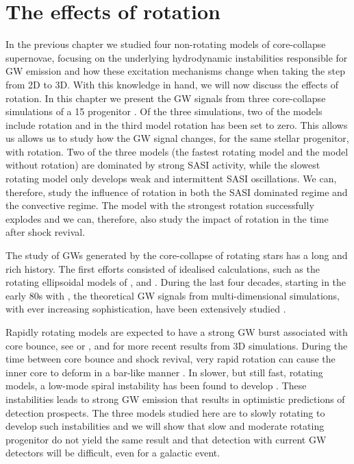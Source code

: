 \chapter{The effects of rotation} \label{ch:paper2}
In the previous chapter we studied four non-rotating models of core-collapse
supernovae, focusing on the underlying hydrodynamic instabilities responsible
for GW emission and how these excitation mechanisms change when taking the step from
2D to 3D. With this knowledge in hand, we will now discuss the effects of rotation.
In this chapter we present the GW signals from three core-collapse simulations of a 15 \msun  
progenitor \citep{heger_05}. Of the three simulations, two of the models include rotation
and in the third model rotation has been set to zero. This allows us allows us to study
how the GW signal changes, for the same stellar progenitor, with rotation.
Two of the three models (the fastest rotating model and the model without rotation)
are dominated by strong SASI activity, while the slowest rotating model only develops weak and intermittent SASI oscillations. 
We can, therefore, study the influence of rotation in both the SASI dominated regime and the convective regime. The model with the strongest
rotation successfully explodes and we can, therefore, also study the impact of rotation in the time after shock revival.

The study of GWs generated by the core-collapse of rotating stars
has a long and rich history. The first efforts consisted of idealised calculations, 
such as the rotating ellipsoidal models of \cite{thuan_74,novikov_76,shapiro_77,saenz_78,saenz_79}, and \cite{saenz_81}.
During the last four decades, starting in the early 80s with \cite{mueller_82}, the theoretical GW signals from multi-dimensional
simulations, with ever increasing sophistication, have been extensively studied 
\citep{mueller_82,finn_90,moenchmeyer_91,yamada_95,zwerger_97,rampp_98,dimmelmeier_01,dimmelmeier_phd,
dimmelmeier_02_b,kotake_03,ott_04,yamada_04,shibata_04,cerda_05,saijo_05,ott_05,shibata_05,kotake_06,
obergaulinger_06b,ott_phd,dimmelmeier_07_a,dimmelmeier_07_bb,dimmelmeier_08,reisswig_11,
takiwaki_11,ott_12,kuroda_14,fuller_15}.

Rapidly rotating models are expected to have a strong GW burst associated with core bounce, 
see \cite{mueller_82} or  \cite{kuroda_14}, and \cite{fuller_15} for more recent results from 3D simulations.
During the time between core bounce and shock revival, very rapid rotation can cause
the inner core to deform in a bar-like manner \citep{rampp_98,shibata_05}.
In slower, but still fast, rotating models, 
a low-mode spiral instability has been found to develop 
\citep{ott_05,kuroda_14,takiwaki_16}. These instabilities leads to strong
GW emission that results in optimistic predictions of detection prospects.
The three models studied here are to slowly rotating to develop such instabilities 
and we will show that slow and moderate rotating progenitor do not yield the same
result and that detection with current GW detectors will be difficult, even for a
galactic event.


